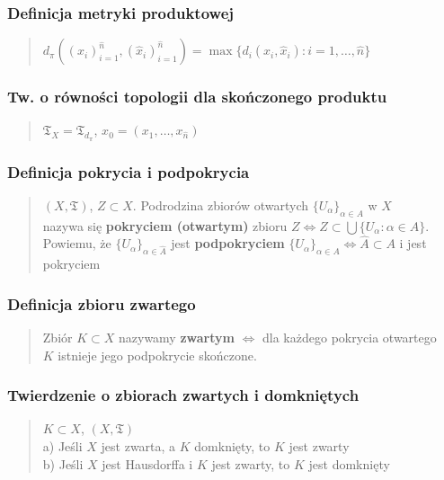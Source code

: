 \documentclass[10pt,a4paper]{article}
\begin{document}
    \subsubsection*{Definicja metryki produktowej}
    \begin{quote}
    $d_\pi((x_i)_{i=1}^{\hat{n}}, (\hat{x}_i)_{i=1}^{\hat{n}}) = \max \{d_i(x_i, \hat{x}_i) : i=1, \dots, \hat{n}\}$ \\
    \end{quote}

    \subsubsection*{Tw. o równości topologii dla skończonego produktu}
    \begin{quote}
    $\mathfrak{T}_X = \mathfrak{T}_{d_\pi}$, $x_0 = (x_1, \dots, x_{\hat{n}})$
    \end{quote}

    \subsubsection*{Definicja pokrycia i podpokrycia}
    \begin{quote}
    $(X, \mathfrak{T})$, $Z \subset X$. Podrodzina zbiorów otwartych $\{U_\alpha\}_{\alpha \in A}$ w $X$ \\
    nazywa się \textbf{pokryciem (otwartym)} zbioru $Z \iff Z \subset \bigcup \{U_\alpha : \alpha \in A\}$. \\
    Powiemu, że $\{U_\alpha\}_{\alpha \in \hat{A}}$ jest \textbf{podpokryciem} $\{U_\alpha\}_{\alpha \in A} \iff \hat{A} \subset A$ i jest pokryciem
    \end{quote}

    \subsubsection*{Definicja zbioru zwartego}
    \begin{quote}
    Zbiór $K \subset X$ nazywamy \textbf{zwartym} $\iff$ dla każdego pokrycia otwartego \\
    $K$ istnieje jego podpokrycie skończone. 
    \end{quote}

    \subsubsection*{Twierdzenie o zbiorach zwartych i domkniętych}
    \begin{quote}
    $K \subset X$, $(X, \mathfrak{T})$ \\
    a) Jeśli $X$ jest zwarta, a $K$ domknięty, to $K$ jest zwarty \\
    b) Jeśli $X$ jest Hausdorffa i $K$ jest zwarty, to $K$ jest domknięty
    \end{quote}
\end{document}
